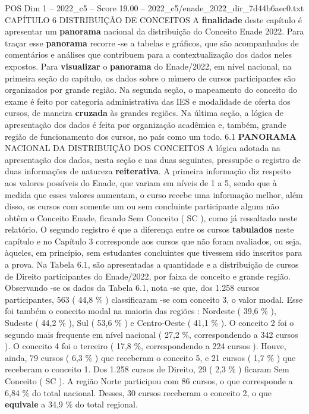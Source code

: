 \begin{textsample}{POS Dim 1 – 2022\_c5 – Score 19.00 – 2022\_c5/enade\_2022\_dir\_7d44b6aec0.txt}
CAPÍTULO 6 DISTRIBUIÇÃO DE CONCEITOS A \textbf{finalidade} deste capítulo é apresentar um \textbf{panorama} nacional da distribuição do Conceito Enade 2022.
Para traçar esse \textbf{panorama} recorre -se a tabelas e gráficos, que são acompanhados de comentários e análises que contribuem para a contextualização dos dados neles expostos.
Para \textbf{visualizar} o \textbf{panorama} do Enade/2022, em nível nacional, na primeira seção do capítulo, os dados sobre o número de cursos participantes são organizados por grande região.
Na segunda seção, o mapeamento do conceito do exame é feito por categoria administrativa das IES e modalidade de oferta dos cursos, de maneira \textbf{cruzada} às grandes regiões.
Na última seção, a lógica de apresentação dos dados é feita por organização acadêmica e, também, grande região de funcionamento dos cursos, no país como um todo. 6.1 \textbf{PANORAMA} NACIONAL DA DISTRIBUIÇÃO DOS CONCEITOS A lógica adotada na apresentação dos dados, nesta seção e nas duas seguintes, pressupõe o registro de duas informações de natureza \textbf{reiterativa}.
A primeira informação diz respeito aos valores possíveis do Enade, que variam em níveis de 1 a 5, sendo que à medida que esses valores aumentam, o curso recebe uma informação melhor, além disso, os cursos com somente um ou sem concluinte participante algum não obtêm o Conceito Enade, ficando Sem Conceito ( SC ), como já ressaltado neste relatório.
O segundo registro é que a diferença entre os cursos \textbf{tabulados} neste capítulo e no Capítulo 3 corresponde aos cursos que não foram avaliados, ou seja, àqueles, em princípio, sem estudantes concluintes que tivessem sido inscritos para a prova.
Na Tabela 6.1, são apresentadas a quantidade e a distribuição de cursos de Direito participantes do Enade/2022, por faixa de conceito e grande região.
Observando -se os dados da Tabela 6.1, nota -se que, dos 1.258 cursos participantes, 563 ( 44,8 \% ) classificaram -se com conceito 3, o valor modal.
Esse foi também o conceito modal na maioria das regiões : Nordeste ( 39,6 \% ), Sudeste ( 44,2 \% ), Sul ( 53,6 \% ) e Centro-Oeste ( 41,1 \% ).
O conceito 2 foi o segundo mais frequente em nível nacional ( 27,2 \%, correspondendo a 342 cursos ).
O conceito 4 foi o terceiro ( 17,8 \%, correspondendo a 224 cursos ).
Houve, ainda, 79 cursos ( 6,3 \% ) que receberam o conceito 5, e 21 cursos ( 1,7 \% ) que receberam o conceito 1.
Dos 1.258 cursos de Direito, 29 ( 2,3 \% ) ficaram Sem Conceito ( SC ).
A região Norte participou com 86 cursos, o que corresponde a 6,84 \% do total nacional.
Desses, 30 cursos receberam o conceito 2, o que \textbf{equivale} a 34,9 \% do total regional.

\end{textsample}
